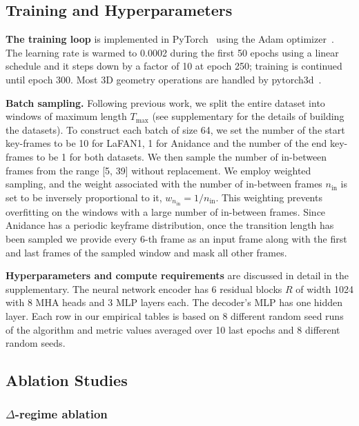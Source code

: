 \documentclass[letterpaper]{article} \usepackage[]{aaai23}  \usepackage{times}  \usepackage{helvet}  \usepackage{courier}  \usepackage[hyphens]{url}  \usepackage{graphicx} \urlstyle{rm} \def\UrlFont{\rm}  \usepackage{natbib}  \usepackage{caption} \frenchspacing  \setlength{\pdfpagewidth}{8.5in} \setlength{\pdfpageheight}{11in}
\begin{document}
\subsection{Training and Hyperparameters} 
\textbf{The training loop} is implemented in PyTorch~\cite{paszke2019pytorch} using the Adam optimizer~\cite{kingma2015adam}. The learning rate is warmed to 0.0002 during the first 50 epochs using a linear schedule and it steps down by a factor of 10 at epoch 250; training is continued until epoch 300. Most 3D geometry operations
are handled by pytorch3d~\citep{ravi2020pytorch3d}.

\textbf{Batch sampling.} Following previous work, we split the entire dataset into windows of maximum length $T_{\max}$ (see supplementary for the details of building the datasets). To construct each batch of size 64, we set the number of the start key-frames to be 10 for LaFAN1, 1 for Anidance and the number of the end key-frames to be 1 for both datasets. We then sample the number of in-between frames from the range [5, 39] without replacement. We employ weighted sampling, and the weight associated with the number of in-between frames $n_{\textrm{in}}$ is set to be inversely proportional to it, $w_{n_{\textrm{in}}} = 1 / n_{\textrm{in}}$. This weighting prevents overfitting on the windows with a large number of in-between frames.
Since Anidance has a periodic keyframe distribution, once the transition length has been sampled we provide every 6-th frame as an input frame along with the first and last frames of the sampled window and mask all other frames.



\textbf{Hyperparameters and compute requirements} are discussed in detail in the supplementary. The neural network encoder has 6 residual blocks $R$ of width 1024 with 8 MHA heads and 3 MLP layers each. The decoder's MLP has one hidden layer. Each row in our empirical tables is based on 8 different random seed runs of the algorithm and metric values averaged over 10 last epochs and 8 different random seeds. 





\subsection{Ablation Studies}

\subsubsection{$\Delta$-regime ablation}
\end{document}
